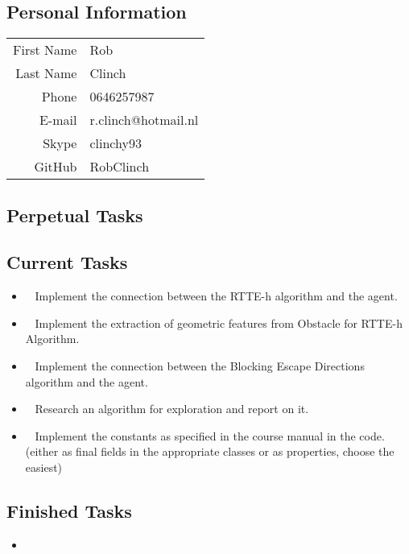 \subsection{Personal Information}
\begin{table}[h!]
	\begin{tabular}{rl}
	First Name 	& Rob\\
	Last Name	& Clinch\\
	Phone		& 0646257987\\
	E-mail		& r.clinch@hotmail.nl\\
	Skype		& clinchy93\\
	GitHub		& RobClinch
\end{tabular}
\end{table}

\subsection{Perpetual Tasks}

\subsection{Current Tasks}
\begin{itemize}
	\item~
	Implement the connection between the RTTE-h algorithm and the agent.
	\item~
	Implement the extraction of geometric features from Obstacle for RTTE-h Algorithm.
	\item~
	Implement the connection between the Blocking Escape Directions algorithm and the agent.
	\item~
	Research an algorithm for exploration and report on it.
	\item~
	Implement the constants as specified in the course manual in the code. (either as final fields in the appropriate classes or as properties, choose the easiest)
\end{itemize}

\subsection{Finished Tasks}
\begin{itemize}
\item
\end{itemize}

